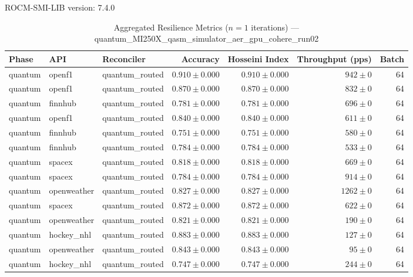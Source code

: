 ROCM-SMI-LIB version: 7.4.0

\begin{table}[htbp]
\caption{Aggregated Resilience Metrics ($n=1$ iterations) --- quantum_MI250X_qasm_simulator_aer_gpu_cohere_run02}
\begin{tabular}{l l l r r r r}
\hline
Phase & API & Reconciler & Accuracy & Hosseini Index & Throughput (pps) & Batch \\
\hline
quantum & openf1 & quantum\_routed & $0.910\pm0.000$ & $0.910\pm0.000$ & $942\pm0$ & 64 \\
quantum & openf1 & quantum\_routed & $0.870\pm0.000$ & $0.870\pm0.000$ & $832\pm0$ & 64 \\
quantum & finnhub & quantum\_routed & $0.781\pm0.000$ & $0.781\pm0.000$ & $696\pm0$ & 64 \\
quantum & openf1 & quantum\_routed & $0.840\pm0.000$ & $0.840\pm0.000$ & $611\pm0$ & 64 \\
quantum & finnhub & quantum\_routed & $0.751\pm0.000$ & $0.751\pm0.000$ & $580\pm0$ & 64 \\
quantum & finnhub & quantum\_routed & $0.784\pm0.000$ & $0.784\pm0.000$ & $533\pm0$ & 64 \\
quantum & spacex & quantum\_routed & $0.818\pm0.000$ & $0.818\pm0.000$ & $669\pm0$ & 64 \\
quantum & spacex & quantum\_routed & $0.784\pm0.000$ & $0.784\pm0.000$ & $914\pm0$ & 64 \\
quantum & openweather & quantum\_routed & $0.827\pm0.000$ & $0.827\pm0.000$ & $1262\pm0$ & 64 \\
quantum & spacex & quantum\_routed & $0.872\pm0.000$ & $0.872\pm0.000$ & $622\pm0$ & 64 \\
quantum & openweather & quantum\_routed & $0.821\pm0.000$ & $0.821\pm0.000$ & $190\pm0$ & 64 \\
quantum & hockey\_nhl & quantum\_routed & $0.883\pm0.000$ & $0.883\pm0.000$ & $127\pm0$ & 64 \\
quantum & openweather & quantum\_routed & $0.843\pm0.000$ & $0.843\pm0.000$ & $95\pm0$ & 64 \\
quantum & hockey\_nhl & quantum\_routed & $0.747\pm0.000$ & $0.747\pm0.000$ & $244\pm0$ & 64 \\

\end{tabular}
\end{table}
